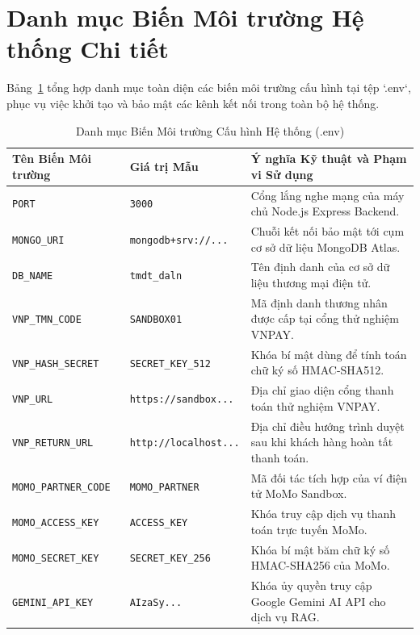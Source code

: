 \documentclass[12pt,a4paper]{report}
\begin{document}
\section{Danh mục Biến Môi trường Hệ thống Chi tiết}
Bảng~\ref{tab:env_config_full} tổng hợp danh mục toàn diện các biến môi trường cấu hình tại tệp `.env`, phục vụ việc khởi tạo và bảo mật các kênh kết nối trong toàn bộ hệ thống.

\begin{table}[H]
\centering
\caption{Danh mục Biến Môi trường Cấu hình Hệ thống (.env)}
\label{tab:env_config_full}
\begin{tabularx}{\textwidth}{p{4.2cm}p{3cm}X}
\toprule
\textbf{Tên Biến Môi trường} & \textbf{Giá trị Mẫu} & \textbf{Ý nghĩa Kỹ thuật và Phạm vi Sử dụng} \\
\midrule
\texttt{PORT} & \texttt{3000} & Cổng lắng nghe mạng của máy chủ Node.js Express Backend. \\
\addlinespace
\texttt{MONGO\_URI} & \texttt{mongodb+srv://...} & Chuỗi kết nối bảo mật tới cụm cơ sở dữ liệu MongoDB Atlas. \\
\addlinespace
\texttt{DB\_NAME} & \texttt{tmdt\_daln} & Tên định danh của cơ sở dữ liệu thương mại điện tử. \\
\addlinespace
\texttt{VNP\_TMN\_CODE} & \texttt{SANDBOX01} & Mã định danh thương nhân được cấp tại cổng thử nghiệm VNPAY. \\
\addlinespace
\texttt{VNP\_HASH\_SECRET} & \texttt{SECRET\_KEY\_512} & Khóa bí mật dùng để tính toán chữ ký số HMAC-SHA512. \\
\addlinespace
\texttt{VNP\_URL} & \texttt{https://sandbox...} & Địa chỉ giao diện cổng thanh toán thử nghiệm VNPAY. \\
\addlinespace
\texttt{VNP\_RETURN\_URL} & \texttt{http://localhost...} & Địa chỉ điều hướng trình duyệt sau khi khách hàng hoàn tất thanh toán. \\
\addlinespace
\texttt{MOMO\_PARTNER\_CODE} & \texttt{MOMO\_PARTNER} & Mã đối tác tích hợp của ví điện tử MoMo Sandbox. \\
\addlinespace
\texttt{MOMO\_ACCESS\_KEY} & \texttt{ACCESS\_KEY} & Khóa truy cập dịch vụ thanh toán trực tuyến MoMo. \\
\addlinespace
\texttt{MOMO\_SECRET\_KEY} & \texttt{SECRET\_KEY\_256} & Khóa bí mật băm chữ ký số HMAC-SHA256 của MoMo. \\
\addlinespace
\texttt{GEMINI\_API\_KEY} & \texttt{AIzaSy...} & Khóa ủy quyền truy cập Google Gemini AI API cho dịch vụ RAG. \\
\bottomrule
\end{tabularx}
\end{table}
\end{document}
